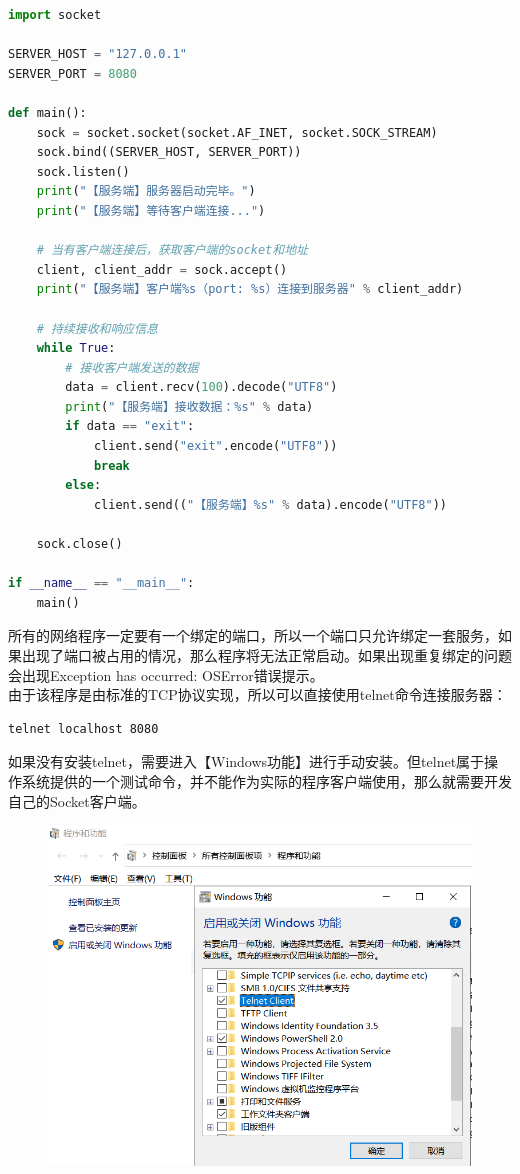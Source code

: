 \vspace{0.5cm}


\begin{lstlisting}[language=Python, title=tcp\_server.py]
import socket

SERVER_HOST = "127.0.0.1"
SERVER_PORT = 8080

def main():
	sock = socket.socket(socket.AF_INET, socket.SOCK_STREAM)
	sock.bind((SERVER_HOST, SERVER_PORT))
	sock.listen()
	print("【服务端】服务器启动完毕。")
	print("【服务端】等待客户端连接...")

	# 当有客户端连接后，获取客户端的socket和地址
	client, client_addr = sock.accept()
	print("【服务端】客户端%s（port: %s）连接到服务器" % client_addr)

	# 持续接收和响应信息
	while True:
		# 接收客户端发送的数据
		data = client.recv(100).decode("UTF8")
		print("【服务端】接收数据：%s" % data)
		if data == "exit":
			client.send("exit".encode("UTF8"))
			break
		else:
			client.send(("【服务端】%s" % data).encode("UTF8"))
	
	sock.close()

if __name__ == "__main__":
	main()
\end{lstlisting}

所有的网络程序一定要有一个绑定的端口，所以一个端口只允许绑定一套服务，如果出现了端口被占用的情况，那么程序将无法正常启动。如果出现重复绑定的问题会出现Exception has occurred: OSError错误提示。\\

由于该程序是由标准的TCP协议实现，所以可以直接使用telnet命令连接服务器：

\vspace{-0.5cm}

\begin{lstlisting}
telnet localhost 8080
\end{lstlisting}

如果没有安装telnet，需要进入【Windows功能】进行手动安装。但telnet属于操作系统提供的一个测试命令，并不能作为实际的程序客户端使用，那么就需要开发自己的Socket客户端。

\begin{figure}[H]
	\centering
	\includegraphics[scale=0.7]{img/C12/12-2/2.png}
\end{figure}

